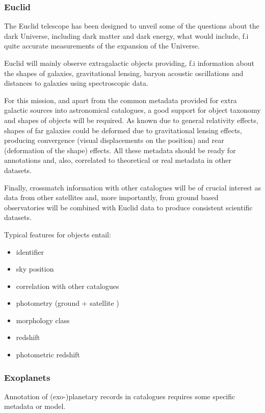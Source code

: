 \subsubsection{Euclid}
The Euclid telescope has been designed to unveil some of the questions about the
dark Universe, including dark matter and dark energy, what would include, f.i
quite accurate measurements of the expansion of the Universe.

Euclid will mainly observe extragalactic objects providing, f.i information
about the shapes of galaxies, gravitational lensing, baryon acoustic oscillations
and distances to galaxies using spectroscopic data.

For this mission, and apart from the common metadata provided for extra galactic
sources into astronomical catalogues, a good support for object taxonomy and
shapes of objects will be required. As known due to general relativity effects,
shapes of far galaxies could be deformed due to gravitational lensing effects,
producing convergence (visual displacements on the position) and rear (deformation
of the shape) effects. All these metadata should be ready for annotations and,
also, correlated to theoretical or real metadata in other datasets.

Finally, crossmatch information with other catalogues will be of crucial interest
as data from other satellites and, more importantly, from ground based
observatories will be combined with Euclid data to produce consistent scientific
datasets.

Typical features for objects entail: 

\begin{itemize}[noitemsep,topsep=0pt,parsep=0pt,partopsep=0pt]
    \item identifier
    \item sky position
    \item correlation with other catalogues
    \item photometry (ground + satellite )
    \item morphology class
    \item redshift
    \item photometric redshift
\end{itemize}

\subsubsection{Exoplanets}
Annotation of (exo-)planetary records in catalogues requires some
specific metadata or model.


